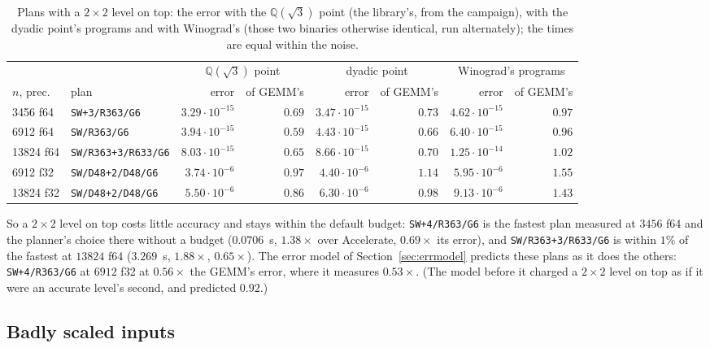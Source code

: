 \documentclass[11pt]{article}
\newcommand{\lv}[1]{\texttt{#1}}
\begin{document}
\begin{table}[!tbp]
\centering\footnotesize
\setlength{\tabcolsep}{3.6pt}
\begin{tabular}{llrrrrrr}
\toprule
 & & \multicolumn{2}{c}{$\mathbb{Q}(\sqrt3)$ point} & \multicolumn{2}{c}{dyadic point} & \multicolumn{2}{c}{Winograd's programs}\\
\cmidrule(lr){3-4}\cmidrule(lr){5-6}\cmidrule(lr){7-8}
$n$, prec. & plan & error & of GEMM's & error & of GEMM's & error & of GEMM's\\
\midrule
3456 f64 & \lv{SW+3/R363/G6} & $3.29\cdot10^{-15}$ & $0.69$ & $3.47\cdot10^{-15}$ & $0.73$ & $4.62\cdot10^{-15}$ & $0.97$\\
6912 f64 & \lv{SW/R363/G6} & $3.94\cdot10^{-15}$ & $0.59$ & $4.43\cdot10^{-15}$ & $0.66$ & $6.40\cdot10^{-15}$ & $0.96$\\
13824 f64 & \lv{SW/R363+3/R633/G6} & $8.03\cdot10^{-15}$ & $0.65$ & $8.66\cdot10^{-15}$ & $0.70$ & $1.25\cdot10^{-14}$ & $1.02$\\
6912 f32 & \lv{SW/D48+2/D48/G6} & $3.74\cdot10^{-6}$ & $0.97$ & $4.40\cdot10^{-6}$ & $1.14$ & $5.95\cdot10^{-6}$ & $1.55$\\
13824 f32 & \lv{SW/D48+2/D48/G6} & $5.50\cdot10^{-6}$ & $0.86$ & $6.30\cdot10^{-6}$ & $0.98$ & $9.13\cdot10^{-6}$ & $1.43$\\
\bottomrule
\end{tabular}
\caption{Plans with a $2\times2$ level on top: the error with the
$\mathbb{Q}(\sqrt3)$ point (the library's, from the campaign), with the dyadic
point's programs and with Winograd's (those two binaries otherwise identical,
run alternately); the times are equal within the noise.}
\label{tab:sw}
\end{table}

So a $2\times2$ level on top costs little accuracy and stays within the
default budget: \lv{SW+4/R363/G6} is the fastest plan measured at $3456$
f64 and the planner's choice there without a budget ($0.0706$~s, $1.38\times$ over Accelerate, $0.69\times$ its error), and
\lv{SW/R363+3/R633/G6} is within $1\%$ of the fastest at $13824$ f64 ($3.269$~s, $1.88\times$,
$0.65\times$).  The error model of Section~\ref{sec:errmodel} predicts
these plans as it does the others: \lv{SW+4/R363/G6} at $6912$ f32 at
$0.56\times$ the GEMM's error, where it measures $0.53\times$.  (The model
before it charged a $2\times2$ level on top as if it were an accurate
level's second, and predicted $0.92$.)

\subsection{Badly scaled inputs}\label{sec:scaled}
\end{document}
